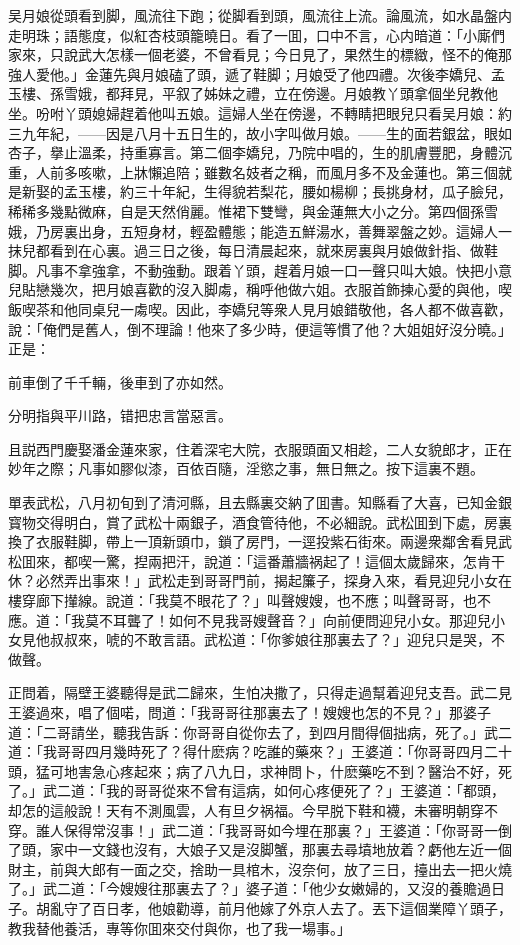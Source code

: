 吴月娘從頭看到脚，風流往下跑；從脚看到頭，風流往上流。論風流，如水晶盤内走明珠；語態度，似紅杏枝頭籠曉日。看了一囬，口中不言，心内暗道：「小廝們家來，只說武大怎樣一個老婆，不曾看見；今日見了，果然生的標緻，怪不的俺那強人愛他。」金蓮先與月娘磕了頭，遞了鞋脚；月娘受了他四禮。次後李嬌兒、孟玉樓、孫雪娥，都拜見，平叙了姊妹之禮，立在傍邊。月娘教丫頭拿個坐兒教他坐。吩咐丫頭媳婦趕着他叫五娘。這婦人坐在傍邊，不轉睛把眼兒只看吴月娘：約三九年紀，——因是八月十五日生的，故小字叫做月娘。——生的面若銀盆，眼如杏子，擧止溫柔，持重寡言。第二個李嬌兒，乃院中唱的，生的肌膚豐肥，身體沉重，人前多咳嗽，上牀懶追陪；雖數名妓者之稱，而風月多不及金蓮也。第三個就是新娶的孟玉樓，約三十年紀，生得貌若梨花，腰如楊柳；長挑身材，瓜子臉兒，稀稀多幾點微麻，自是天然俏麗。惟裙下雙彎，與金蓮無大小之分。第四個孫雪娥，乃房裏出身，五短身材，輕盈體態；能造五鮮湯水，善舞翠盤之妙。這婦人一抹兒都看到在心裏。過三日之後，每日清晨起來，就來房裏與月娘做針指、做鞋脚。凡事不拿強拿，不動強動。跟着丫頭，趕着月娘一口一聲只叫大娘。快把小意兒貼戀幾次，把月娘喜歡的沒入脚䖏，稱呼他做六姐。衣服首飾揀心愛的與他，喫飯喫茶和他同桌兒一䖏喫。因此，李嬌兒等衆人見月娘錯敬他，各人都不做喜歡，說：「俺們是舊人，倒不理論！他來了多少時，便這等慣了他？大姐姐好沒分曉。」正是：
\begin{myquote}
前車倒了千千輛，後車到了亦如然。

分明指與平川路，错把忠言當惡言。
\end{myquote}

且説西門慶娶潘金蓮來家，住着深宅大院，衣服頭面又相趁，二人女貌郎才，正在妙年之際；凡事如膠似漆，百依百隨，淫慾之事，無日無之。按下這裏不題。

單表武松，八月初旬到了清河縣，且去縣裏交納了囬書。知縣看了大喜，已知金銀寳物交得明白，賞了武松十兩銀子，酒食管待他，不必細說。武松囬到下處，房裏換了衣服鞋脚，帶上一頂新頭巾，鎖了房門，一逕投紫石街來。兩邊衆鄰舍看見武松囬來，都喫一驚，揑兩把汗，說道：「這番蕭牆祸起了！這個太歲歸來，怎肯干休？必然弄出事來！」武松走到哥哥門前，揭起簾子，探身入來，看見迎兒小女在樓穿廊下攆線。說道：「我莫不眼花了？」叫聲嫂嫂，也不應；叫聲哥哥，也不應。道：「我莫不耳聾了！如何不見我哥嫂聲音？」向前便問迎兒小女。那迎兒小女見他叔叔來，唬的不敢言語。武松道：「你爹娘往那裏去了？」迎兒只是哭，不做聲。

正問着，隔壁王婆聽得是武二歸來，生怕决撒了，只得走過幫着迎兒支吾。武二見王婆過來，唱了個喏，問道：「我哥哥往那裏去了！嫂嫂也怎的不見？」那婆子道：「二哥請坐，聽我告訴：你哥哥自從你去了，到四月間得個拙病，死了。」武二道：「我哥哥四月幾時死了？得什麽病？吃誰的藥來？」王婆道：「你哥哥四月二十頭，猛可地害急心疼起來；病了八九日，求神問卜，什麽藥吃不到？醫治不好，死了。」武二道：「我的哥哥從來不曾有這病，如何心疼便死了？」王婆道：「都頭，却怎的這般說！天有不測風雲，人有旦夕祸福。今早脱下鞋和襪，未審明朝穿不穿。誰人保得常沒事！」武二道：「我哥哥如今埋在那裏？」王婆道：「你哥哥一倒了頭，家中一文錢也沒有，大娘子又是沒脚蟹，那裏去尋墳地放着？虧他左近一個財主，前與大郎有一面之交，捨助一具棺木，沒奈何，放了三日，擡出去一把火燒了。」武二道：「今嫂嫂往那裏去了？」婆子道：「他少女嫩婦的，又沒的養贍過日子。胡亂守了百日孝，他娘勸導，前月他嫁了外京人去了。丟下這個業障丫頭子，教我替他養活，專等你囬來交付與你，也了我一場事。」

